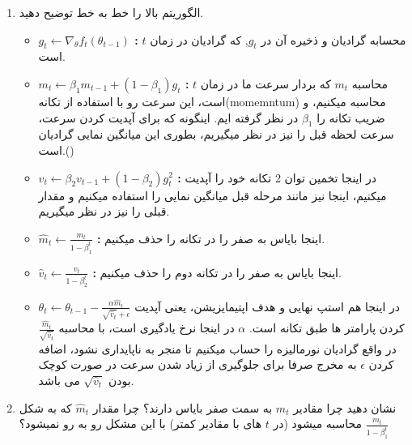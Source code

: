 \begin{enumerate}
	\item {
	      الگوریتم بالا را خط به خط توضیح دهید.
	      \begin{qsolve}[]
		      \begin{itemize}
			      \item \textbf{$g_t \leftarrow  \nabla_\theta f_t(\theta_{t-1})$ : } محسابه گرادیان و ذخیره آن در $g_t$, که گرادیان در زمان $t$ است.
			      \item {
			            \textbf{$m_t \leftarrow \beta_1m_{t-1}+(1-\beta_1)g_t$ : }
			            محاسبه $m_t$ که بردار سرعت ما در زمان $t$ است، این سرعت رو با استفاده از تکانه(momemntum) محاسبه میکنیم، و ضریب تکانه را $\beta_1$ در نظر گرفته ایم.
			            اینگونه که برای آپدیت کردن سرعت، سرعت لحظه قبل را نیز در نظر میگیریم، بطوری این میانگین نمایی گرادیان است.()
			            }
			      \item {
			            \textbf{$v_t \leftarrow \beta_2v_{t-1}+(1-\beta_2)g_t^2$ : }
			            در اینجا تخمین توان 2 تکانه خود را آپدیت میکنیم، اینجا نیز مانند مرحله قبل میانگین نمایی را استفاده میکنیم و مقدار قبلی را نیز در نظر میگیریم.
			            }
			      \item {
			            \textbf{$\hat{m}_t \leftarrow \frac{m_t}{1-\beta_1^t}$ : }
			            اینجا بایاس به صفر را در تکانه را حذف میکنیم.
			            }
			      \item {
			            \textbf{$\hat{v}_t \leftarrow \frac{v_t}{1-\beta_2^t}$ : }
			            اینجا بایاس به صفر را در تکانه دوم را حذف میکنیم.
			            }
			      \item {
			            \textbf{$\theta_t\leftarrow \theta_{t-1}-\frac{\alpha\hat{m}_t}{\sqrt{\hat{v}_t}+\epsilon}$}
			            در اینجا هم استپ نهایی و هدف اپتیمایزیشن، یعنی آپدیت کردن پارامتر ها طبق تکانه است.
			            $\alpha$ در اینجا نرخ یادگیری است، با محاسبه $\frac{\hat{m}_t}{\sqrt{\hat{v}_t}}$ در واقع گرادیان نورمالیزه را حساب میکنیم تا منجر به ناپایداری نشود،
			            اضافه کردن $\epsilon$ به مخرج صرفا برای جلوگیری از زیاد شدن سرعت در صورت کوچک بودن $\sqrt{\hat{v}_t}$ می باشد.
			            }
		      \end{itemize}
	      \end{qsolve}
	      }
	\item {
	      نشان دهید چرا مقادیر $m_t$ به سمت صفر بایاس دارند؟ چرا مقدار $\hat{m}_t$ که به شکل $\frac{m_t}{1-\beta_1^t}$ محاسبه میشود (در $t$ های با مقادیر کمتر) با این مشکل رو به رو نمیشود؟

}
\end{enumerate}
